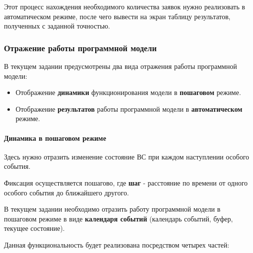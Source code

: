 \documentclass[a4paper, 14pt]{article}
\begin{document}
Этот процесс нахождения необходимого количества заявок нужно реализовать в автоматическом режиме, после чего вывести на экран таблицу результатов, полученных с заданной точностью.

\subsubsection{Отражение работы программной модели}

В текущем задании предусмотрены два вида отражения работы программной модели:
\begin{itemize}
	\item Отображение \textbf{динамики} функционирования модели в \textbf{пошаговом} режиме.
	\item Отображение \textbf{результатов} работы программной модели в \textbf{автоматическом} режиме.
\end{itemize}

\paragraph{Динамика в пошаговом режиме}

Здесь нужно отразить изменение состояние ВС при каждом наступлении особого события.

Фиксация осуществляется пошагово, где \textbf{шаг} - расстояние по времени от одного особого события до ближайшего другого.

В текущем задании необходимо отразить работу программной модели в пошаговом режиме в виде \textbf{календаря событий} (календарь событий, буфер, текущее состояние).

Данная функциональность будет реализована посредством четырех частей:
\end{document}

